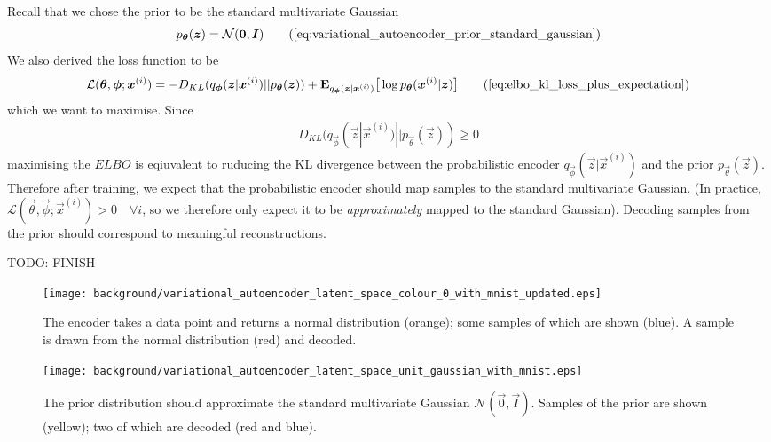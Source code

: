 Recall that we chose the prior to be the standard multivariate Gaussian
\begin{align}
p_{\vec{\theta}}(\vec{z}) = \mathcal{N}(\vec{0}, \vec{I})
\tag{\ref{eq:variational_autoencoder_prior_standard_gaussian}}
\end{align}
We also derived the loss function to be
\begin{align}
\mathcal{L}(\vec{\theta}, \vec{\phi}; \vec{x}^{(i)}) = -D_{KL}(q_{\vec{\phi}}(\vec{z}|\vec{x}^{(i)}) || p_{\vec{\theta}}(\vec{z})) + \mathbf{E}_{q_{\vec{\phi}}(\vec{z}|\vec{x}^{(i)})}\big[\log p_{\vec{\theta}}(\vec{x}^{(i)} | \vec{z}) \big]
\tag{\ref{eq:elbo_kl_loss_plus_expectation}}
\end{align}
which we want to maximise. Since
\begin{align}
D_{KL}(q_{\vec{\phi}}(\vec{z}|\vec{x}^{(i)}) || p_{\vec{\theta}}(\vec{z})) \geq 0
\end{align}
maximising the $ELBO$ is eqiuvalent to ruducing the KL divergence between the probabilistic encoder $q_{\vec{\phi}}(\vec{z}|\vec{x}^{(i)})$ and the prior $p_{\vec{\theta}}(\vec{z})$. Therefore after training, we expect that the probabilistic encoder should map samples to the standard multivariate Gaussian. (In practice, $\mathcal{L}(\vec{\theta}, \vec{\phi}; \vec{x}^{(i)}) > 0 \quad \forall i$, so we therefore only expect it to be \textit{approximately} mapped to the standard Gaussian). Decoding samples from the prior should correspond to meaningful reconstructions.

TODO: FINISH

\begin{figure}[h!]
\centering
\captionsetup{justification=centering}
\texttt{[image: background/variational\_autoencoder\_latent\_space\_colour\_0\_with\_mnist\_updated.eps]}
\caption{The encoder takes a data point and returns a normal distribution (orange); some samples of which are shown (blue). A sample is drawn from the normal distribution (red) and decoded. \cite{Dykeman2016}}
\label{fig:variational_autoencoder_latent_space_colour_0_with_mnist_updated}
\end{figure}

\begin{figure}[h!]
\centering
\captionsetup{justification=centering}
\texttt{[image: background/variational\_autoencoder\_latent\_space\_unit\_gaussian\_with\_mnist.eps]}
\caption{The prior distribution should approximate the standard multivariate Gaussian $\mathcal{N}(\vec{0}, \vec{I})$. Samples of the prior are shown (yellow); two of which are decoded (red and blue). \cite{Dykeman2016}}
\label{fig:variational_autoencoder_latent_space_unit_gaussian_with_mnist}
\end{figure}

